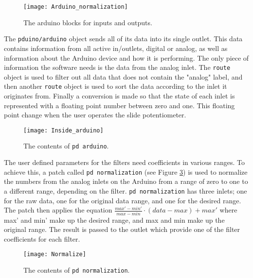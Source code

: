 \begin{figure}
\centering
\texttt{[image: Arduino\_normalization]}
\caption{The arduino blocks for inputs and outputs.}
\label{Fig:Arudino_normalization}
\end{figure}

The \texttt{pduino/arduino} object sends all of its data into its single outlet. This data contains information from all active in/outlets, digital or analog, as well as information about the Arduino device and how it is performing. The only piece of information the software needs is the data from the analog inlet. The \texttt{route} object is used to filter out all data that does not contain the "analog" label, and then another \texttt{route} object is used to sort the data according to the inlet it originates from. Finally a conversion is made so that the state of each inlet is represented with a floating point number between zero and one. This floating point change when the user operates the slide potentiometer.


\begin{figure}
\centering
\texttt{[image: Inside\_arduino]}
\caption{The contents of \texttt{pd arduino}.}
\label{Fig:Inside_arduino}
\end{figure}

The user defined parameters for the filters need coefficients in various ranges. To achieve this, a patch called \texttt{pd normalization} (see Figure \ref{Fig:Normalize}) is used to normalize the numbers from the analog inlets on the Arduino from a range of zero to one to a different range, depending on the filter. \texttt{pd normalization} has three inlets; one for the raw data, one for the original data range, and one for the desired range. The patch then applies the equation $\frac{max'-min'}{max-min}\cdot (data-max)+max'$ where max' and min' make up the desired range, and max and min make up the original range. The result is passed to the outlet which provide one of the filter coefficients for each filter. 

\begin{figure}
\centering
\texttt{[image: Normalize]}
\caption{The contents of \texttt{pd normalization}.}
\label{Fig:Normalize}
\end{figure}